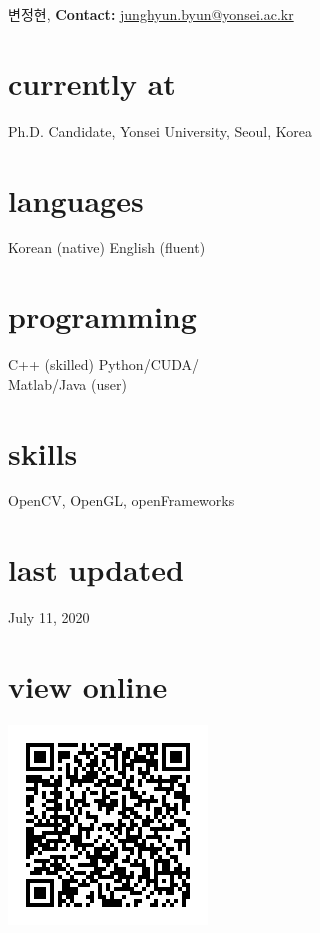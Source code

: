 \documentclass[]{friggeri-cv}
\begin{document}
       { 변정현, 
       \textbf{Contact:}
       \href{mailto:junghyun.byun@yonsei.ac.kr}{junghyun.byun@yonsei.ac.kr}}

\begin{aside}
  \section{currently at}
    Ph.D. Candidate, Yonsei University, Seoul, Korea
  \section{languages}
    Korean (native)
    English (fluent)
  \section{programming}
    C++ (skilled)
    Python/CUDA/\\Matlab/Java (user)
  \section{skills}
    OpenCV, OpenGL, openFrameworks
  \section{last updated}
    July 11, 2020
  \section{view online}
    \includegraphics[width=\textwidth]{data/cv_qr_code}
\end{aside}
\end{document}
